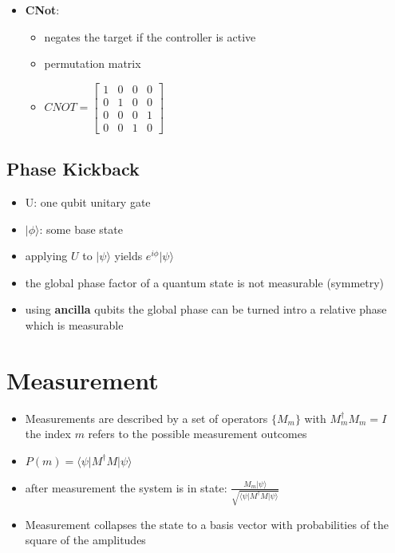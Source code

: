 \documentclass[12pt,a4paper]{article}
\newcommand{\ecb}[1]{\{#1\}}
\newcommand{\ket}[1]{\vert #1 \rangle}
\newcommand{\tek}[1]{\langle #1 \vert}
\begin{document}
\begin{itemize}
\item \textbf{CNot}:
\begin{itemize}
\item negates the target if the controller is active
\item permutation matrix
\item $CNOT = \begin{bmatrix}1 & 0 & 0 & 0\\0 & 1 & 0 & 0\\0 & 0 & 0 & 1\\0 & 0 & 1 & 0 \end{bmatrix}$
\end{itemize} 
\end{itemize}

\subsection{Phase Kickback}
\begin{itemize}
\item U: one qubit unitary gate 
\item $\ket{\phi}$: some base state 
\item applying $U$ to $\ket{\psi}$ yields $e^{i\phi}\ket{\psi}$
\item the global phase factor of a quantum state is not measurable (symmetry)
\item using \textbf{ancilla} qubits the global phase can be turned intro a relative phase which is measurable
\end{itemize}


\section{Measurement}
\begin{itemize}
\item Measurements are described by a set of operators $\ecb{M_m}$ with $M_m^\dagger M_m = I$\\the index $m$ refers to the possible measurement outcomes
\item $P(m) = \tek{\psi}M^\dagger M \ket{\psi}$
\item after measurement the system is in state: $\displaystyle \frac{M_m\ket{\psi}}{\sqrt{\tek{\psi}M^\dagger M\ket{\psi}}}$
\item Measurement collapses the state to a basis vector with probabilities of the square of the amplitudes
\end{itemize}
\end{document}
